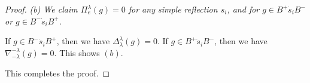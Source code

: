 \documentclass[10pt,a4paper]{amsart}
\begin{document}
\begin{proof}
{\it (b) We claim $\Pi^\lambda_e(g) = 0 $ for any simple reflection $s_i$, and for $g \in B^+\dot s_iB^-$ or $g \in B^-\dot s_iB^+$.} 

If $g \in B^-\dot s_iB^+$, then we have $\Delta^{\lambda}_{\lambda}(g) = 0$. If $g \in B^+\dot s_iB^-$, then we have $\nabla^{-\lambda}_{-\lambda}(g) = 0$. This shows $(b)$. 

This completes the proof.
\end{proof}
\end{document}
